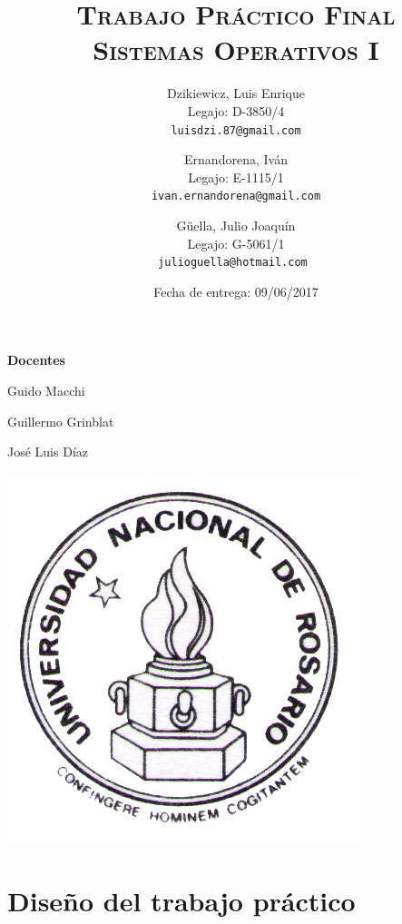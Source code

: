 \documentclass[a4paper]{article}
\author{
        Dzikiewicz, Luis Enrique\\
        Legajo: D-3850/4\\
        \texttt{luisdzi.87@gmail.com}
        \and Ernandorena, Iván\\
        Legajo: E-1115/1\\
        \texttt{ivan.ernandorena@gmail.com}
        \and Güella, Julio Joaquín\\
        Legajo: G-5061/1\\
        \texttt{julioguella@hotmail.com }
}
\date{
    Fecha de entrega: 09/06/2017
}
\title {
    \Huge  \textsc{Trabajo Práctico Final\\}
    \large \textsc{Sistemas Operativos I}
}
\begin{document}

    \maketitle

    \thispagestyle{empty}

    \begin{center}
         \large \bf Docentes
    \end{center}

    \begin{center}
      Guido Macchi
      
      Guillermo Grinblat

      José Luis Díaz
        \vspace{2cm}

        \includegraphics[scale=1.5]{Logo-Unr}
    

    \end{center}


\newpage




\section*{Diseño del trabajo práctico}
\end{document}
